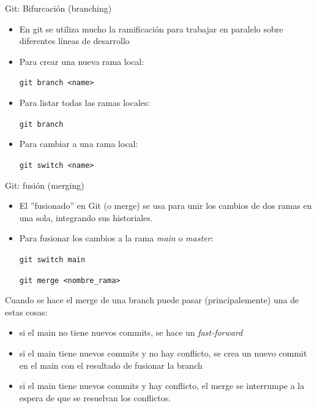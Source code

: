 \documentclass{beamer}
\begin{document}
\begin{frame}{Git: Bifurcación (branching)}

\begin{itemize}
    \item En git se utiliza mucho la ramificación para trabajar en paralelo sobre diferentes líneas de desarrollo

    \item Para crear una nueva rama local:

    \texttt{git branch <name>}

    \item Para listar todas las ramas locales:

    \texttt{git branch}

    \item Para cambiar a una rama local:

    \texttt{git switch <name>}
\end{itemize}
    
\end{frame}

\begin{frame}{Git: fusión (merging)}

\begin{itemize}
    \item El ''fusionado'' en Git (o merge) se usa para unir los cambios de dos ramas en una sola, integrando sus historiales.

    \item Para fusionar los cambios a la rama \textit{main} o \textit{master}:

    \texttt{git switch main}

    \texttt{git merge <nombre\_rama>}
    
\end{itemize}

\pause

Cuando se hace el merge de una branch puede pasar (principalemente) una de estas cosas:

\begin{itemize}
    \item si el main no tiene nuevos commits, se hace un \textit{fast-forward}
    \item si el main tiene nuevos commits y no hay conflicto, se crea un nuevo commit en el main con el resultado de fusionar la branch
    \item si el main tiene nuevos commits y hay conflicto, el merge se interrumpe a la espera de que se resuelvan los conflictos.
\end{itemize}


\end{frame}
\end{document}
